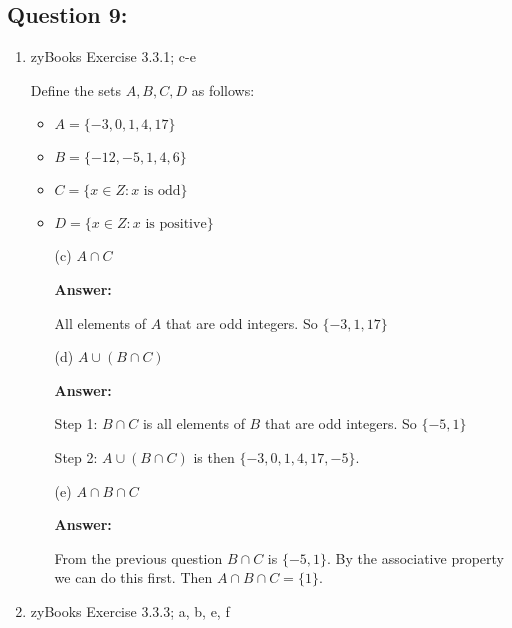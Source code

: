 \documentclass[14pt]{extreport}
\newcommand{\answer}[0]{\medskip \textbf{Answer:} \medskip}
\newcommand{\union}[0]{\cup}
\newcommand{\intersect}[0]{\cap}
\begin{document}
\subsection*{Question 9:}

\begin{enumerate}
    
    \item zyBooks Exercise 3.3.1; c-e
    
    Define the sets \( A, B, C, D \) as follows:
    \begin{itemize}
        \item \( A = \{-3, 0, 1, 4, 17\} \)
        \item \( B = \{-12, -5, 1, 4, 6\} \)
        \item \( C = \{x \in Z: x \text{ is odd}\} \)
        \item \( D = \{x \in Z: x \text{ is positive}\} \)
    \end{itemize}

        \begin{enumerate}
            
            \item[(c)] \( A \intersect C \)
            
                \answer

                All elements of \( A \) that are odd integers. So \( \{-3, 1, 17\} \)

            \item[(d)] \( A \union (B \intersect C) \)
            
                \answer

                Step 1: \( B \intersect C \) is all elements of \( B \) that are odd integers. So \( \{ -5, 1 \} \)

                \medskip

                Step 2: \( A \union (B \intersect C) \) is then \( \{ -3, 0, 1, 4, 17, -5 \} \). 

            \item[(e)] \( A \intersect B \intersect C \)  
            
                \answer

                From the previous question \( B \intersect C \) is \( \{ -5, 1 \} \). By the associative property we can do this first. Then \( A \intersect B \intersect C = \{ 1 \} \).

        \end{enumerate}

    \item zyBooks Exercise 3.3.3; a, b, e, f
    

\end{enumerate}
\end{document}
